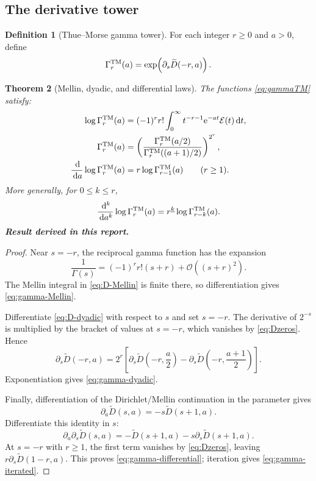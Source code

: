 \documentclass[11pt,oneside]{article}
\numberwithin{equation}{section}
\newtheorem{theorem}{Theorem}[section]
\theoremstyle{definition}
\newtheorem{definition}[theorem]{Definition}
\theoremstyle{remark}
\newcommand{\e}{\mathrm e}
\newcommand{\dd}{\,\mathrm d}
\newcommand{\bigO}{\mathcal O}
\newcommand{\fall}[2]{#1^{\underline{#2}}}
\newcommand{\newresult}{\textbf{Result derived in this report.}}
\begin{document}
\subsection{The derivative tower}

\begin{definition}[Thue--Morse gamma tower]
For each integer $r\ge0$ and $a>0$, define
\begin{equation}
 \Gamma_r^{\rm TM}(a)
 =\exp\!\left(\partial_s\widetilde D(-r,a)\right).
 \label{eq:gammaTM}
\end{equation}
\end{definition}

\begin{theorem}[Mellin, dyadic, and differential laws]
\label{thm:gamma-tower}
The functions \eqref{eq:gammaTM} satisfy:
\begin{align}
 \log\Gamma_r^{\rm TM}(a)
 &=(-1)^rr!\int_0^\infty
 t^{-r-1}\e^{-at}\mathcal E(t)\dd t,
 \label{eq:gamma-Mellin}\\
 \Gamma_r^{\rm TM}(a)
 &=\left(
 \frac{\Gamma_r^{\rm TM}(a/2)}
 {\Gamma_r^{\rm TM}((a+1)/2)}
 \right)^{2^r},
 \label{eq:gamma-dyadic}\\
 \frac{\dd}{\dd a}\log\Gamma_r^{\rm TM}(a)
 &=r\log\Gamma_{r-1}^{\rm TM}(a)
 \qquad(r\ge1).
 \label{eq:gamma-differential}
\end{align}
More generally, for $0\le k\le r$,
\begin{equation}
 \frac{\dd^k}{\dd a^k}\log\Gamma_r^{\rm TM}(a)
 =\fall{r}{k}\log\Gamma_{r-k}^{\rm TM}(a).
 \label{eq:gamma-iterated}
\end{equation}
\newresult
\end{theorem}

\begin{proof}
Near $s=-r$, the reciprocal gamma function has the expansion
\[
 \frac1{\Gamma(s)}=(-1)^rr!(s+r)+\bigO((s+r)^2).
\]
The Mellin integral in \eqref{eq:D-Mellin} is finite there, so differentiation gives
\eqref{eq:gamma-Mellin}.

Differentiate \eqref{eq:D-dyadic} with respect to $s$ and set $s=-r$.  The derivative of
$2^{-s}$ is multiplied by the bracket of values at $s=-r$, which vanishes by
\eqref{eq:Dzeros}.  Hence
\[
 \partial_s\widetilde D(-r,a)
 =2^r\left[
 \partial_s\widetilde D\!\left(-r,\frac a2\right)
 -\partial_s\widetilde D\!\left(-r,\frac{a+1}{2}\right)
 \right].
\]
Exponentiation gives \eqref{eq:gamma-dyadic}.

Finally, differentiation of the Dirichlet/Mellin continuation in the parameter gives
\[
 \partial_a\widetilde D(s,a)=-s\widetilde D(s+1,a).
\]
Differentiate this identity in $s$:
\[
 \partial_a\partial_s\widetilde D(s,a)
 =-\widetilde D(s+1,a)-s\partial_s\widetilde D(s+1,a).
\]
At $s=-r$ with $r\ge1$, the first term vanishes by \eqref{eq:Dzeros}, leaving
$r\partial_s\widetilde D(1-r,a)$.  This proves \eqref{eq:gamma-differential}; iteration gives
\eqref{eq:gamma-iterated}.
\end{proof}
\end{document}
